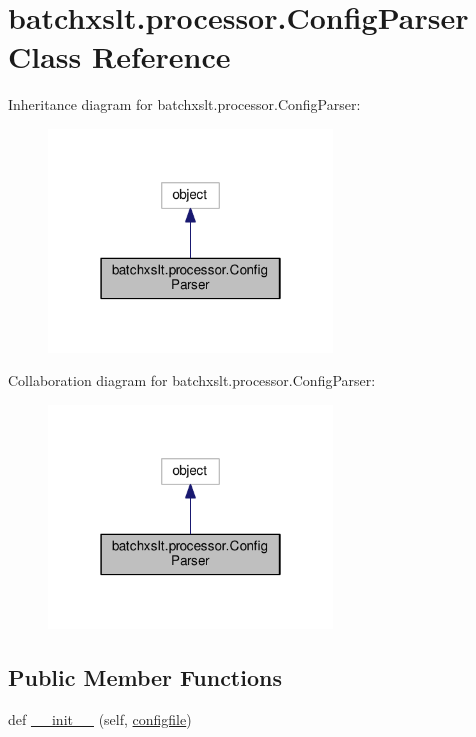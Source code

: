 \hypertarget{classbatchxslt_1_1processor_1_1_config_parser}{}\section{batchxslt.\+processor.\+Config\+Parser Class Reference}
\label{classbatchxslt_1_1processor_1_1_config_parser}


Inheritance diagram for batchxslt.\+processor.\+Config\+Parser\+:
\nopagebreak
\begin{figure}[H]
\begin{center}
\leavevmode
\includegraphics[width=214pt]{d9/dfc/classbatchxslt_1_1processor_1_1_config_parser__inherit__graph}
\end{center}
\end{figure}


Collaboration diagram for batchxslt.\+processor.\+Config\+Parser\+:
\nopagebreak
\begin{figure}[H]
\begin{center}
\leavevmode
\includegraphics[width=214pt]{d8/d50/classbatchxslt_1_1processor_1_1_config_parser__coll__graph}
\end{center}
\end{figure}
\subsection*{Public Member Functions}
\begin{DoxyCompactItemize}
\item 
def \hyperlink{classbatchxslt_1_1processor_1_1_config_parser_a7fb0c145c83583d9b32be29bf049c8a8}{\+\_\+\+\_\+init\+\_\+\+\_\+} (self, \hyperlink{classbatchxslt_1_1processor_1_1_config_parser_a98c0047e4a75ef19343b92fbdd27a17c}{configfile})
\end{DoxyCompactItemize}
